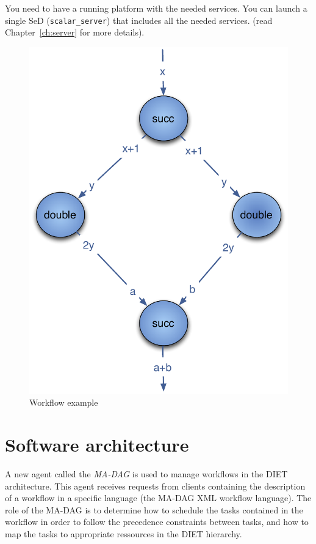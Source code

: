 You need to have a running \diet platform with the needed services. You
can launch a single SeD (\texttt{scalar\_server}) that includes all the
needed services. (read Chapter~\ref{ch:server} for more details).

\begin{figure}[htbp]
  \centering
  \includegraphics[keepaspectratio,width=0.4\linewidth]{fig/wf_example1}
  \caption{Workflow example}
  \label{fig:example1}
\end{figure}

\section{Software architecture}


A new agent called the \textit{MA-DAG} is used to manage workflows
in the DIET architecture. This agent receives requests from clients
containing the description of a workflow in a specific language
(the MA-DAG XML workflow language). The role of the MA-DAG is to
determine how to schedule the tasks contained in the workflow in
order to follow the precedence constraints between tasks, and how to
map the tasks to appropriate ressources in the DIET hierarchy.

